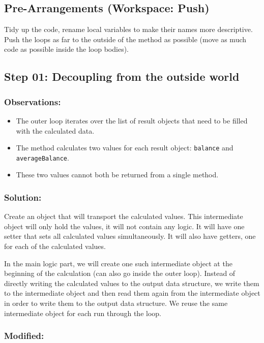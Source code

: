 \documentclass[a4paper,fleqn,titlepage,11pt]{article}
\begin{document}
\subsection*{Pre-Arrangements (Workspace: Push)}

Tidy up the code, rename local variables to make their names more descriptive.
Push the loops as far to the outside of the method as possible (move as much code as possible inside the loop bodies).

\subsection*{Step 01: Decoupling from the outside world}

\subsubsection*{Observations:}
\begin{itemize}
\item The outer loop iterates over the list of result objects that need to be filled with the calculated data.
\item The method calculates two values for each result object: \texttt{balance} and \texttt{averageBalance}. 
\item These two values cannot both be returned from a single method.
\end{itemize}

\subsubsection*{Solution:}

Create an object that will transport the calculated values. 
This intermediate object will only hold the values, it will not contain any logic. It will have one setter that sets all calculated values simultaneously. It will also have getters, one for each of the calculated values.

In the main logic part, we will create one such intermediate object at the beginning of the calculation (can also go inside the outer loop). Instead of directly writing the calculated values to the output data structure, we write them to the intermediate object and then read them again from the intermediate object in order to write them to the output data structure. We reuse the same intermediate object for each run through the loop.

\subsubsection*{Modified:}
\end{document}
